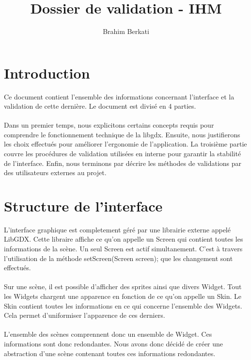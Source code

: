 \documentclass[11pt]{article} %
\title{Dossier de validation - IHM}
\author{Brahim Berkati}
\begin{document}
\maketitle

\section{Introduction}
\paragraph{}
Ce document contient l'ensemble des informations concernant l'interface et la validation de cette dernière. Le document est divisé en 4 parties.
\paragraph{}
Dans un premier temps, nous explicitons certains concepts requis pour comprendre le fonctionnement technique de la libgdx. Ensuite, nous justifierons les choix effectués pour améliorer l'ergonomie de l'application. La troisième partie couvre les procédures de validation utilisées en interne pour garantir la stabilité de l'interface. Enfin, nous terminons par décrire les méthodes de validations par des utilisateurs externes au projet.

\section{Structure de l'interface}
\paragraph{}
L'interface graphique est completement géré par une librairie externe appelé LibGDX. Cette libraire affiche ce qu'on appelle un Screen qui contient toutes les informations de la scène. Un seul Screen est actif simultanement. C'est à travers l'utilisation de la méthode setScreen(Screen screen); que les changement sont effectués.
\paragraph{}
Sur une scène, il est possible d'afficher des sprites ainsi que divers Widget. Tout les Widgets chargent une apparence en fonction de ce qu'on appelle un Skin. Le Skin contient toutes les informations en ce qui concerne l'ensemble des Widgets. Cela permet d'uniformiser l'apparence de ces derniers.
\paragraph{}
L'ensemble des scènes comprennent donc un ensemble de Widget. Ces informations sont donc redondantes. Nous avons donc décidé de créer une abstraction d'une scène contenant toutes ces informations redondantes.
\end{document}
